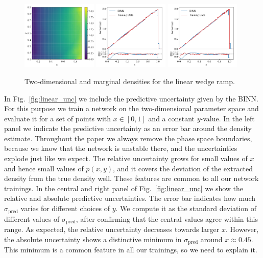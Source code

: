 \begin{figure}[b!]
\centering
\includegraphics[width=0.32\textwidth, page=1]{./figures/bINN/linear_2dhists}
\includegraphics[width=0.32\textwidth, page=1]{./figures/bINN/linear_1dhists}
\includegraphics[width=0.32\textwidth, page=2]{./figures/bINN/linear_1dhists}
\caption{Two-dimensional and marginal densities for the linear wedge
  ramp.}
\label{fig:linear_ring_hists}
\end{figure}

In Fig.~\ref{fig:linear_unc} we include the predictive uncertainty
given by the BINN. For this purpose we train a network on the
two-dimensional parameter space and evaluate it for a set of points
with $x \in [0,1]$ and a constant $y$-value. In the left panel we
indicate the predictive uncertainty as an error bar around the density
estimate. Throughout the paper we always remove the phase space
boundaries, because we know that the network is unstable there, and
the uncertainties explode just like we expect. The relative
uncertainty grows for small values of $x$ and hence small values of
$p(x,y)$, and it covers the deviation of the extracted density from
the true density well. These features are common to all our network
trainings. In the central and right panel of Fig.~\ref{fig:linear_unc}
we show the relative and absolute predictive uncertainties. The error
bar indicates how much $\sigma_\text{pred}$ varies for different
choices of $y$. We compute it as the standard deviation of different
values of $\sigma_\text{pred}$, after confirming that the central
values agree within this range. As expected, the relative uncertainty
decreases towards larger $x$. However, the absolute uncertainty shows
a distinctive minimum in $\sigma_\text{pred}$ around $x \approx
0.45$. This minimum is a common feature in all our trainings, so we
need to explain it.

